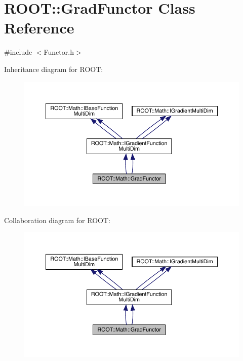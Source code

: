\hypertarget{classROOT_1_1Math_1_1GradFunctor}{}\section{R\+O\+OT\+:\+:Grad\+Functor Class Reference}
\label{classROOT_1_1Math_1_1GradFunctor}


{\ttfamily \#include $<$Functor.\+h$>$}



Inheritance diagram for R\+O\+OT\+:\nopagebreak
\begin{figure}[H]
\begin{center}
\leavevmode
\includegraphics[width=350pt]{de/d4b/classROOT_1_1Math_1_1GradFunctor__inherit__graph}
\end{center}
\end{figure}


Collaboration diagram for R\+O\+OT\+:\nopagebreak
\begin{figure}[H]
\begin{center}
\leavevmode
\includegraphics[width=350pt]{da/d5d/classROOT_1_1Math_1_1GradFunctor__coll__graph}
\end{center}
\end{figure}
